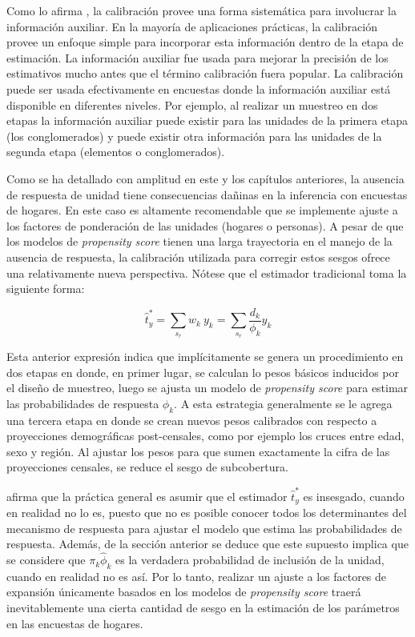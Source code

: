 \documentclass[
  12pt,
]{book}
\begin{document}
Como lo afirma \citet{Sar08}, la calibración provee una forma sistemática para involucrar la información auxiliar. En la mayoría de aplicaciones prácticas, la calibración provee un enfoque simple para incorporar esta información dentro de la etapa de estimación. La información auxiliar fue usada para mejorar la precisión de los estimativos mucho antes que el término calibración fuera popular. La calibración puede ser usada efectivamente en encuestas donde la información auxiliar está disponible en diferentes niveles. Por ejemplo, al realizar un muestreo en dos etapas la información auxiliar puede existir para las unidades de la primera etapa (los conglomerados) y puede existir otra información para las unidades de la segunda etapa (elementos o conglomerados).

Como se ha detallado con amplitud en este y los capítulos anteriores, la ausencia de respuesta de unidad tiene consecuencias dañinas en la inferencia con encuestas de hogares. En este caso es altamente recomendable que se implemente ajuste a los factores de ponderación de las unidades (hogares o personas). A pesar de que los modelos de \emph{propensity score} tienen una larga trayectoria en el manejo de la ausencia de respuesta, la calibración utilizada para corregir estos sesgos ofrece una relativamente nueva perspectiva. Nótese que el estimador tradicional toma la siguiente forma:

\[
\hat t_y^* = \sum_{s_r} w_k\ y_k = \sum_{s_r} \frac{d_k}{\phi_k} y_k 
\]

Esta anterior expresión indica que implícitamente se genera un procedimiento en dos etapas en donde, en primer lugar, se calculan lo pesos básicos inducidos por el diseño de muestreo, luego se ajusta un modelo de \emph{propensity score} para estimar las probabilidades de respuesta \(\phi_k\). A esta estrategia generalmente se le agrega una tercera etapa en donde se crean nuevos pesos calibrados con respecto a proyecciones demográficas post-censales, como por ejemplo los cruces entre edad, sexo y región. Al ajustar los pesos para que sumen exactamente la cifra de las proyecciones censales, se reduce el sesgo de subcobertura.

\citet{Sar08} afirma que la práctica general es asumir que el estimador \(\hat t_y^*\) es insesgado, cuando en realidad no lo es, puesto que no es posible conocer todos los determinantes del mecanismo de respuesta para ajustar el modelo que estima las probabilidades de respuesta. Además, de la sección anterior se deduce que este supuesto implica que se considere que \(\pi_k \hat\phi_k\) es la verdadera probabilidad de inclusión de la unidad, cuando en realidad no es así. Por lo tanto, realizar un ajuste a los factores de expansión únicamente basados en los modelos de \emph{propensity score} traerá inevitablemente una cierta cantidad de sesgo en la estimación de los parámetros en las encuestas de hogares.
\end{document}
